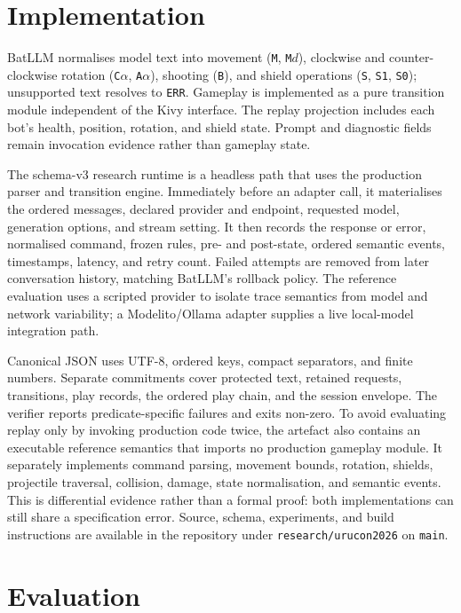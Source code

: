 \documentclass[conference,a4paper]{IEEEtran}
\begin{document}
\section{Implementation}
BatLLM normalises model text into movement (\texttt{M}, \texttt{M}$d$), clockwise and counter-clockwise rotation (\texttt{C}$\alpha$, \texttt{A}$\alpha$), shooting (\texttt{B}), and shield operations (\texttt{S}, \texttt{S1}, \texttt{S0}); unsupported text resolves to \texttt{ERR}. Gameplay is implemented as a pure transition module independent of the Kivy interface. The replay projection includes each bot's health, position, rotation, and shield state. Prompt and diagnostic fields remain invocation evidence rather than gameplay state.

The schema-v3 research runtime is a headless path that uses the production parser and transition engine. Immediately before an adapter call, it materialises the ordered messages, declared provider and endpoint, requested model, generation options, and stream setting. It then records the response or error, normalised command, frozen rules, pre- and post-state, ordered semantic events, timestamps, latency, and retry count. Failed attempts are removed from later conversation history, matching BatLLM's rollback policy. The reference evaluation uses a scripted provider to isolate trace semantics from model and network variability; a Modelito/Ollama adapter supplies a live local-model integration path.

Canonical JSON uses UTF-8, ordered keys, compact separators, and finite numbers. Separate commitments cover protected text, retained requests, transitions, play records, the ordered play chain, and the session envelope. The verifier reports predicate-specific failures and exits non-zero. To avoid evaluating replay only by invoking production code twice, the artefact also contains an executable reference semantics that imports no production gameplay module. It separately implements command parsing, movement bounds, rotation, shields, projectile traversal, collision, damage, state normalisation, and semantic events. This is differential evidence rather than a formal proof: both implementations can still share a specification error. Source, schema, experiments, and build instructions are available in the repository under \texttt{research/urucon2026} on \texttt{main}.

\section{Evaluation}
\end{document}

